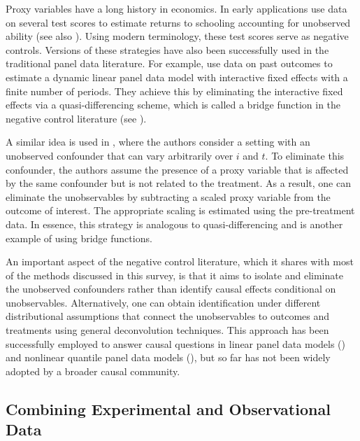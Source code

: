 \documentclass[letterpaper,12pt,leqno]{article}
\begin{document}
Proxy variables have a long history in economics. In early applications \citep{griliches1977estimating,chamberlain1977education} use data on several test scores to estimate returns to schooling accounting for unobserved ability (see also \citealp{deaner2021many}). Using modern terminology, these test scores serve as negative controls.  Versions of these strategies have also been successfully used in the traditional panel data literature. For example, \citep{holtz1988estimating} use data on past outcomes to estimate a dynamic linear panel data model with interactive fixed effects with a finite number of periods. They achieve this by eliminating the interactive fixed effects via a quasi-differencing scheme, which is called a bridge function in the negative control literature (see \citealp{imbens2021controlling,ying2021proximal}).

A similar idea is used in \citep{freyaldenhoven2019pre}, where the authors consider a setting with an unobserved confounder that can vary arbitrarily over $i$ and $t$. To eliminate this confounder, the authors assume the presence of a proxy variable that is affected by the same confounder but is not related to the treatment. As a result, one can eliminate the unobservables by subtracting a scaled proxy variable from the outcome of interest. The appropriate scaling is estimated using the pre-treatment data. In essence, this strategy is analogous to quasi-differencing and is another example of using bridge functions.

An important aspect of the negative control literature, which it shares with most of the methods discussed in this survey, is that it aims to isolate and eliminate the unobserved confounders rather than identify causal effects conditional on unobservables.  Alternatively, one can obtain identification under different distributional assumptions that connect the unobservables to outcomes and treatments using general deconvolution techniques. This approach has been successfully employed to answer causal questions in linear panel data models (\citealp{bonhomme2011recovering,arellano2011identifying}) and nonlinear quantile panel data models (\citealp{arellano2016nonlinear}), but so far has not been widely adopted by a broader causal community. 

\subsection{Combining Experimental and Observational Data}
\end{document}
